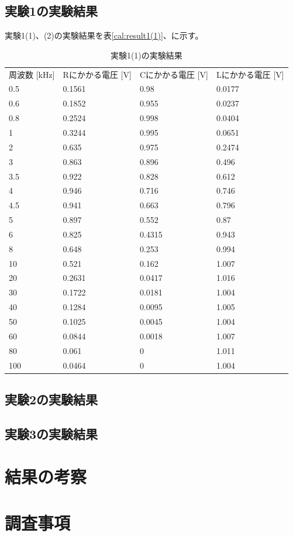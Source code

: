 \documentclass[11pt,a4paper,fleqn]{jsarticle}
\begin{document}
\subsection{実験1の実験結果}
実験1(1)、(2)の実験結果を表\ref{cal:result1(1)}、に示す。
\begin{table}[!h]
\centering
\caption{実験1(1)の実験結果}
\label{cal:result1}
\begin{tabular}{llll}
周波数 {[}kHz{]} & Rにかかる電圧 {[}V{]} & Cにかかる電圧 {[}V{]} & Lにかかる電圧 {[}V{]} \\
0.5           & 0.1561          & 0.98            & 0.0177          \\
0.6           & 0.1852          & 0.955           & 0.0237          \\
0.8           & 0.2524          & 0.998           & 0.0404          \\
1             & 0.3244          & 0.995           & 0.0651          \\
2             & 0.635           & 0.975           & 0.2474          \\
3             & 0.863           & 0.896           & 0.496           \\
3.5           & 0.922           & 0.828           & 0.612           \\
4             & 0.946           & 0.716           & 0.746           \\
4.5           & 0.941           & 0.663           & 0.796           \\
5             & 0.897           & 0.552           & 0.87            \\
6             & 0.825           & 0.4315          & 0.943           \\
8             & 0.648           & 0.253           & 0.994           \\
10            & 0.521           & 0.162           & 1.007           \\
20            & 0.2631          & 0.0417          & 1.016           \\
30            & 0.1722          & 0.0181          & 1.004           \\
40            & 0.1284          & 0.0095          & 1.005           \\
50            & 0.1025          & 0.0045          & 1.004           \\
60            & 0.0844          & 0.0018          & 1.007           \\
80            & 0.061           & 0               & 1.011           \\
100           & 0.0464          & 0               & 1.004          
\end{tabular}
\end{table}
\subsection{実験2の実験結果}
\subsection{実験3の実験結果}

\section{結果の考察}
%
\section{調査事項}
%
\end{document}
